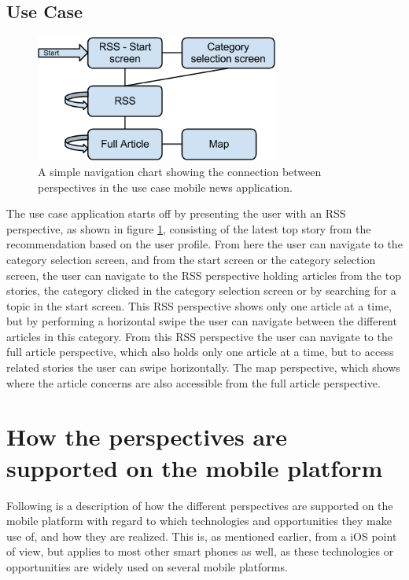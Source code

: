 \subsection{Use Case}

\begin{figure}[!htbp]
\centering
\includegraphics[width=80mm]{GFX/statecharts/UseCase.png}
\caption{A simple navigation chart showing the connection between perspectives in the use case mobile news application.}
\label{state_chart_usecase}
\end{figure}

The use case application starts off by presenting the user with an RSS perspective, as shown in figure \ref{state_chart_usecase}, consisting of the latest top story from the recommendation based on the user profile. From here the user can navigate to the category selection screen, and from the start screen or the category selection screen, the user can navigate to the RSS perspective holding articles from the top stories, the category clicked in the category selection screen or by searching for a topic in the start screen. This RSS perspective shows only one article at a time, but by performing a horizontal swipe the user can navigate between the different articles in this category. From this RSS perspective the user can navigate to the full article perspective, which also holds only one article at a time, but to access related stories the user can swipe horizontally. The map perspective, which shows where the article concerns are also accessible from the full article perspective.

\section{How the perspectives are supported on the mobile platform}

Following is a description of how the different perspectives are supported on the mobile platform with regard to which technologies and opportunities they make use of, and how they are realized. This is, as mentioned earlier, from a iOS point of view, but applies to most other smart phones as well, as these technologies or opportunities are widely used on several mobile platforms.


